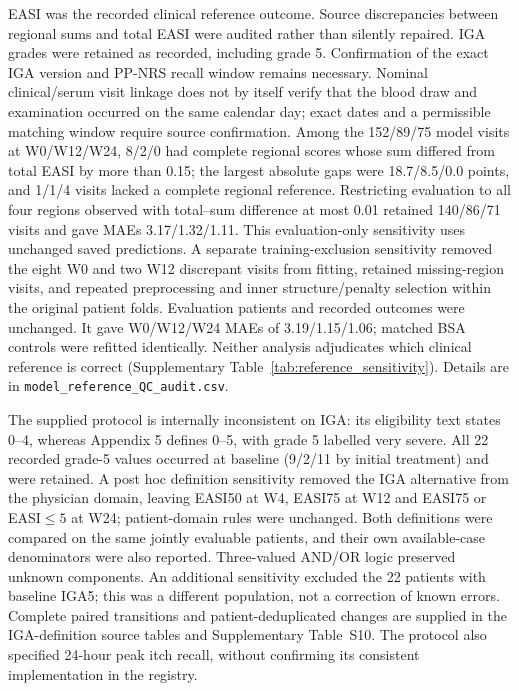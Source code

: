 EASI was the recorded clinical reference outcome. Source discrepancies between regional sums and total EASI were audited rather than silently repaired. IGA grades were retained as recorded, including grade 5. Confirmation of the exact IGA version and PP-NRS recall window remains necessary. Nominal clinical/serum visit linkage does not by itself verify that the blood draw and examination occurred on the same calendar day; exact dates and a permissible matching window require source confirmation. Among the 152/89/75 model visits at W0/W12/W24, 8/2/0 had complete regional scores whose sum differed from total EASI by more than 0.15; the largest absolute gaps were 18.7/8.5/0.0 points, and 1/1/4 visits lacked a complete regional reference. Restricting evaluation to all four regions observed with total--sum difference at most 0.01 retained 140/86/71 visits and gave MAEs 3.17/1.32/1.11. This evaluation-only sensitivity uses unchanged saved predictions. A separate training-exclusion sensitivity removed the eight W0 and two W12 discrepant visits from fitting, retained missing-region visits, and repeated preprocessing and inner structure/penalty selection within the original patient folds. Evaluation patients and recorded outcomes were unchanged. It gave W0/W12/W24 MAEs of 3.19/1.15/1.06; matched BSA controls were refitted identically. Neither analysis adjudicates which clinical reference is correct (Supplementary Table~\ref{tab:reference_sensitivity}). Details are in \texttt{model\_reference\_QC\_audit.csv}.

The supplied protocol is internally inconsistent on IGA: its eligibility text states 0--4, whereas Appendix 5 defines 0--5, with grade 5 labelled very severe. All 22 recorded grade-5 values occurred at baseline (9/2/11 by initial treatment) and were retained. A post hoc definition sensitivity removed the IGA alternative from the physician domain, leaving EASI50 at W4, EASI75 at W12 and EASI75 or EASI$\leq5$ at W24; patient-domain rules were unchanged. Both definitions were compared on the same jointly evaluable patients, and their own available-case denominators were also reported. Three-valued AND/OR logic preserved unknown components. An additional sensitivity excluded the 22 patients with baseline IGA5; this was a different population, not a correction of known errors. Complete paired transitions and patient-deduplicated changes are supplied in the IGA-definition source tables and Supplementary Table~S10. The protocol also specified 24-hour peak itch recall, without confirming its consistent implementation in the registry.

